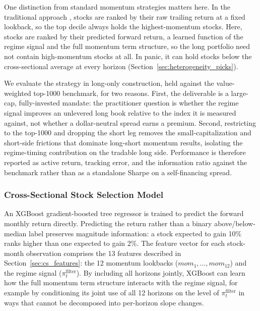 One distinction from standard momentum strategies matters here. In the traditional approach \citep{JegadeeshTitman1993}, stocks are ranked by their raw trailing return at a fixed lookback, so the top decile always holds the highest-momentum stocks. Here, stocks are ranked by their predicted forward return, a learned function of the regime signal and the full momentum term structure, so the long portfolio need not contain high-momentum stocks at all. In panic, it can hold stocks below the cross-sectional average at every horizon (Section~\ref{sec:heterogeneity_picks}).

We evaluate the strategy in long-only construction, held against the value-weighted top-1000 benchmark, for two reasons. First, the deliverable is a large-cap, fully-invested mandate: the practitioner question is whether the regime signal improves an unlevered long book relative to the index it is measured against, not whether a dollar-neutral spread earns a premium. Second, restricting to the top-1000 and dropping the short leg removes the small-capitalization and short-side frictions that dominate long-short momentum results, isolating the regime-timing contribution on the tradable long side. Performance is therefore reported as active return, tracking error, and the information ratio against the benchmark rather than as a standalone Sharpe on a self-financing spread.

\subsubsection{Cross-Sectional Stock Selection Model}\label{sec:methods}

An XGBoost gradient-boosted tree regressor \citep{Chen2016} is trained to predict the forward monthly return directly. Predicting the return rather than a binary above/below-median label preserves magnitude information: a stock expected to gain 10\% ranks higher than one expected to gain 2\%. The feature vector for each stock-month observation comprises the 13 features described in Section~\ref{sec:cs_features}: the 12 momentum lookbacks ($mom_1, \dots, mom_{12}$) and the regime signal ($\pi_t^{\text{filter}}$). By including all horizons jointly, XGBoost can learn how the full momentum term structure interacts with the regime signal, for example by conditioning its joint use of all 12 horizons on the level of $\pi_t^{\text{filter}}$ in ways that cannot be decomposed into per-horizon slope changes.

